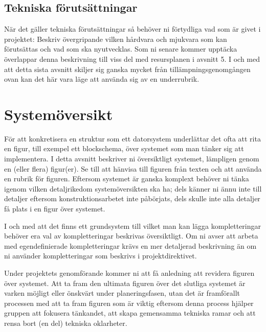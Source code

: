 \documentclass{article}
\begin{document}
\subsection{Tekniska förutsättningar}
När det gäller tekniska förutsättningar så behöver ni förtydliga vad som är givet
i projektet: Beskriv övergripande vilken hårdvara och mjukvara som kan förutsättas och vad som ska nyutvecklas. Som ni senare kommer upptäcka överlappar
denna beskrivning till viss del med resursplanen i avsnitt 5. I och med att detta
sista avsnitt skiljer sig ganska mycket från tillämpningsgenomgången ovan kan
det här vara läge att använda sig av en underrubrik.

\section{Systemöversikt}
För att konkretisera en struktur som ett datorsystem underlättar det ofta att
rita en figur, till exempel ett blockschema, över systemet som man tänker sig
att implementera. I detta avsnitt beskriver ni översiktligt systemet, lämpligen
genom en (eller flera) figur(er). Se till att hänvisa till figuren från texten och att
använda en rubrik för figuren. Eftersom systemet är ganska komplext behöver
ni tänka igenom vilken detaljrikedom systemöversikten ska ha; dels känner ni
ännu inte till detaljer eftersom konstruktionsarbetet inte påbörjats, dels skulle
inte alla detaljer få plats i en figur över systemet.\par
I och med att det finns ett grundsystem till vilket man kan lägga kompletteringar behöver era val av kompletteringar beskrivas översiktligt. Om ni avser att
arbeta med egendefinierade kompletteringar krävs en mer detaljerad beskrivning
än om ni använder kompletteringar som beskrivs i projektdirektivet.\par
Under projektets genomförande kommer ni att få anledning att revidera
figuren över systemet. Att ta fram den ultimata figuren över det slutliga systemet
är varken möjligt eller önskvärt under planeringsfasen, utan det är framförallt
processen med att ta fram figuren som är viktig eftersom denna process hjälper
gruppen att fokusera tänkandet, att skapa gemensamma tekniska ramar och att
rensa bort (en del) tekniska oklarheter.
\end{document}
